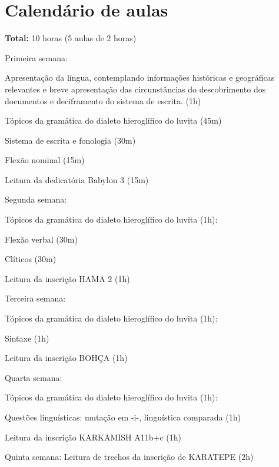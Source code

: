 \documentclass[article,12pt]{memoir}
\begin{document}
\chapter{Calendário de aulas}

\textbf{Total:} 10 horas (5 aulas de 2 horas)

\begin{compactitem}
	\item Primeira semana:
	\begin{compactitem}
		\item Apresentação da língua, contemplando informações históricas e
		geográficas relevantes e breve apresentação das circunstâncias do
		descobrimento dos documentos e deciframento do sistema de escrita.
		(1h)
		\item Tópicos da gramática do dialeto hieroglífico do luvita (45m)

		\begin{compactitem}
			\item Sistema de escrita e fonologia (30m)
			\item Flexão nominal (15m)
		\end{compactitem}
		\item Leitura da dedicatória Babylon 3 (15m)
	\end{compactitem}
	\item Segunda semana:

	\begin{compactitem}
		\item Tópicos da gramática do dialeto hieroglífico do luvita (1h):
		\begin{compactitem}
			\item Flexão verbal (30m)
			\item Clíticos (30m)
		\end{compactitem}
		\item Leitura da inscrição HAMA 2 (1h)
	\end{compactitem}
	\item Terceira semana:
	\begin{compactitem}
		\item Tópicos da gramática do dialeto hieroglífico do luvita (1h):
		\begin{compactitem}
			\item Sintaxe (1h)
		\end{compactitem}
		\item Leitura da inscrição BOHÇA (1h)
	\end{compactitem}
	\item Quarta semana:
	\begin{compactitem}
		\item Tópicos da gramática do dialeto hieroglífico do luvita (1h):
		\begin{compactitem}
			\item Questões linguísticas: mutação em -i-, linguística comparada (1h)
		\end{compactitem}
		\item Leitura da inscrição KARKAMISH A11b+c (1h)
	\end{compactitem}
	\item Quinta semana: Leitura de trechos da inscrição de KARATEPE (2h)
\end{compactitem}
\end{document}
